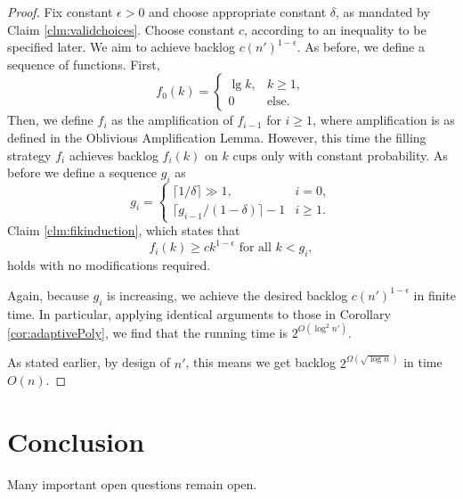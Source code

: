 \documentclass[twocolumn]{article}[10pt]
\begin{document}
\begin{proof}
  Fix constant $\epsilon > 0$ and choose appropriate constant $\delta$, as
  mandated by Claim \ref{clm:validchoices}. Choose constant $c$, according to
  an inequality to be specified later. We aim to achieve backlog
  $c(n')^{1-\epsilon}$.
  As before, we define a sequence of functions. First,
  $$f_0(k) = 
  \begin{cases} 
    \lg k, & k\geq 1, \\
    0 & \text{else.}
  \end{cases}$$
  Then, we define $f_i$ as the amplification of $f_{i-1}$ for $i \ge 1$, where
  amplification is as defined in the Oblivious Amplification Lemma. 
  However, this time the filling strategy $f_i$ achieves backlog $f_i(k)$ on
  $k$ cups only with constant probability.
  As before we define a sequence $g_i$ as 
  $$ g_i = \begin{cases}
    \lceil 1/\delta \rceil \gg 1,  & i = 0,\\
    \lceil g_{i-1}/(1-\delta)\rceil -1 & i  \ge 1.
  \end{cases} $$
  Claim \ref{clm:fikinduction}, which states that 
  $$f_i(k) \ge ck^{1-\epsilon} \text{ for all } k < g_i,$$
  holds with no modifications required.

  Again, because $g_i$ is increasing, we achieve the desired backlog
  $c(n')^{1-\epsilon}$ in finite time. In particular, applying identical
  arguments to those in Corollary \ref{cor:adaptivePoly}, we find that the
  running time is $2^{O(\log^2 n')}$.

  As stated earlier, by design of $n'$, this means we get backlog
  $2^{\Omega(\sqrt{\log n})}$ in time $O(n)$.

\end{proof}

\section{Conclusion}
Many important open questions remain open.



\end{document}
